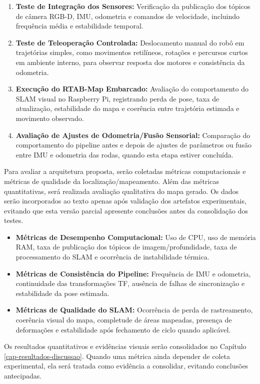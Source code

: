 \begin{enumerate}
    \item \textbf{Teste de Integração dos Sensores:} Verificação da publicação dos tópicos de câmera RGB-D, IMU, odometria e comandos de velocidade, incluindo frequência média e estabilidade temporal.

    \item \textbf{Teste de Teleoperação Controlada:} Deslocamento manual do robô em trajetórias simples, como movimentos retilíneos, rotações e percursos curtos em ambiente interno, para observar resposta dos motores e consistência da odometria.
    
    \item \textbf{Execução do RTAB-Map Embarcado:} Avaliação do comportamento do SLAM visual no Raspberry Pi, registrando perda de pose, taxa de atualização, estabilidade do mapa e coerência entre trajetória estimada e movimento observado.

    \item \textbf{Avaliação de Ajustes de Odometria/Fusão Sensorial:} Comparação do comportamento do pipeline antes e depois de ajustes de parâmetros ou fusão entre IMU e odometria das rodas, quando esta etapa estiver concluída.
\end{enumerate}

Para avaliar a arquitetura proposta, serão coletadas métricas computacionais e métricas de qualidade da localização/mapeamento. Além das métricas quantitativas, será realizada avaliação qualitativa do mapa gerado. Os dados serão incorporados ao texto apenas após validação dos artefatos experimentais, evitando que esta versão parcial apresente conclusões antes da consolidação dos testes.

\begin{itemize}
    \item \textbf{Métricas de Desempenho Computacional:} Uso de CPU, uso de memória RAM, taxa de publicação dos tópicos de imagem/profundidade, taxa de processamento do SLAM e ocorrência de instabilidade térmica.
    \item \textbf{Métricas de Consistência do Pipeline:} Frequência de IMU e odometria, continuidade das transformações TF, ausência de falhas de sincronização e estabilidade da pose estimada.
    \item \textbf{Métricas de Qualidade do SLAM:} Ocorrência de perda de rastreamento, coerência visual do mapa, completude de áreas mapeadas, presença de deformações e estabilidade após fechamento de ciclo quando aplicável.
\end{itemize}

Os resultados quantitativos e evidências visuais serão consolidados no Capítulo \ref{cap-resultados-discussao}. Quando uma métrica ainda depender de coleta experimental, ela será tratada como evidência a consolidar, evitando conclusões antecipadas.
